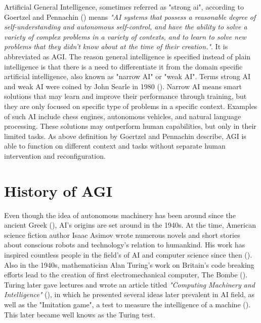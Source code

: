 \documentclass[utf8,english]{gradu3}
\begin{document}
Artificial General Intelligence, sometimes referred as "strong ai", according to Goertzel and Pennachin (\cite*{goertzel2007}) means \emph{"AI systems that possess a reasonable degree of self-understanding and autonomous self-control, and have the ability to solve a variety of complex problems in a variety of contexts, and to learn to solve new problems that they didn't know about at the time of their creation."}. It is abbreviated as AGI. The reason general intelligence is specified instead of plain intelligence is that there is a need to differentiate it from the domain specific artificial intelligence, also known as "narrow AI" or "weak AI". Terms strong AI and weak AI were coined by John Searle in 1980 (\cite{searle1980}). Narrow AI means smart solutions that may learn and improve their performance through training, but they are only focused on specific type of problems in a specific context. Examples of such AI include chess engines, autonomous vehicles, and natural language processing. These solutions may outperform human capabilities, but only in their limited tasks.
As above definition by Goertzel and Pennachin describe, AGI is able to function on different context and tasks without separate human intervention and reconfiguration.


\section{History of AGI} 
% 
Even though the idea of autonomous machinery has been around since the ancient Greek (\cite{}), AI's origins are set around in the 1940s. At the time, American science fiction author Isaac Asimov wrote numerous novels and short stories about conscious robots and technology's relation to humankind. His work has inspired countless people in the field's of AI and computer science since then (\cite{kaplan2019}).
Also in the 1940s, mathematician Alan Turing's work on Britain's code breaking efforts lead to the creation of first electromechanical computer, The Bombe (\cite{kaplan2019}). Turing later gave lectures and wrote an article titled \emph{"Computing Machinery and Intelligence"} (\cite*{turing1950}), in which he presented several ideas later prevalent in AI field, as well as the "Imitation game", a test to measure the intelligence of a machine (\cite{norvig2002}). This later became well knows as the Turing test.
\end{document}
